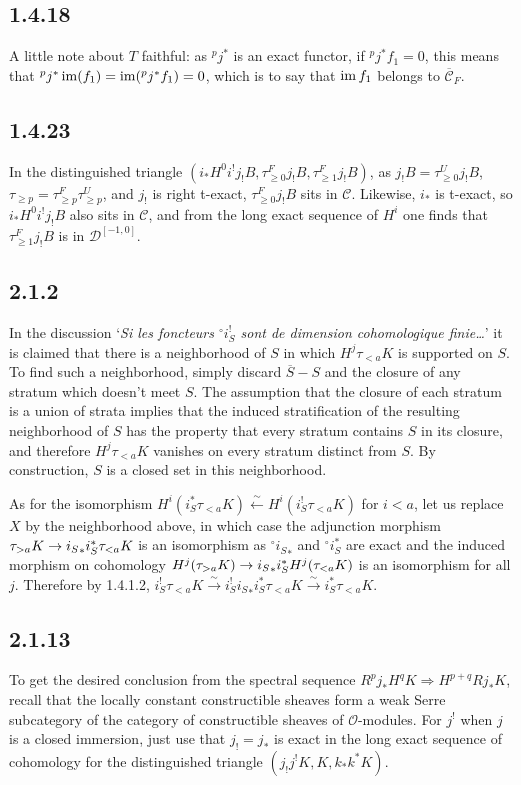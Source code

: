 \documentclass[deligne.tex]{subfiles}
\begin{document}
	\subsection*{1.4.18} A little note about $T$ faithful: as $^pj^*$ is an exact
	functor, if $^pj^*f_1=0$, this means that 
	${}^pj^*\operatorname{im}(f_1)=\operatorname{im}(^pj^*f_1)=0$, which is to say that $\operatorname{im} f_1$
	belongs to $\overline{\mathcal C}_F$.
		
	\subsection*{1.4.23} In the distinguished triangle
	$(i_*H^0i^!j_!B,\tau_{\geq0}^Fj_!B,\tau_{\geq1}^Fj_!B)$,
	as $j_!B=\tau_{\geq0}^Uj_!B$,
	$\tau_{\geq p}=\tau_{\geq p}^F\tau_{\geq p}^U$,
	and $j_!$ is right t-exact, $\tau_{\geq0}^Fj_!B$ sits in $\mathcal C$.
	Likewise, $i_*$ is t-exact, so $i_*H^0i^!j_!B$ also sits in
	$\mathcal C$, and from the long exact sequence of $H^i$ one finds
	that $\tau_{\geq1}^Fj_!B$ is in $\mathcal D^{[-1,0]}$.
	
	\subsection*{2.1.2} In the discussion `\emph{Si les foncteurs $^\circ i^!_S$
	sont de dimension cohomologique finie…}' it is claimed that there is a
	neighborhood of $S$ in which $H^j\tau_{<a}K$ is supported on $S$.
	To find such a neighborhood, simply discard $\overline S-S$ and the
	closure of any stratum which doesn't meet $S$. The assumption that the
	closure of each stratum is a union of strata implies that the induced
	stratification of the resulting neighborhood of $S$ has the property
	that every stratum contains $S$ in its closure, and therefore
	$H^j\tau_{<a}K$ vanishes on every stratum distinct from $S$.
	By construction, $S$ is a closed set in this neighborhood.
	
	As for the isomorphism
	$H^i(i_S^*\tau_{<a}K)\xleftarrow{\sim}H^i(i_S^!\tau_{<a}K)$ for $i<a$,
	let us replace $X$ by the neighborhood above, in which case
	the adjunction morphism $\tau_{>a}K\rightarrow{i_S}_*i_S^*\tau_{<a}K$ is an
	isomorphism as $^\circ{i_S}_*$ and $^\circ i_S^*$ are exact and the 
	induced morphism on cohomology
	$H^j(\tau_{>a}K)\rightarrow{i_S}_*i_S^*H^j(\tau_{<a}K)$ is an
	isomorphism for all $j$. Therefore by 1.4.1.2,
	$i^!_S\tau_{<a}K\xrightarrow{\sim}i_S^!{i_S}_*i_S^*\tau_{<a}K\xrightarrow{\sim}i_S^*\tau_{<a}K$.
	
	\subsection*{2.1.13} To get the desired conclusion from the spectral sequence
	$R^pj_*H^qK\Rightarrow H^{p+q}Rj_*K$, recall that the locally constant
	constructible sheaves form a weak Serre subcategory of the category of 
	constructible sheaves of $\mathcal O$-modules. For $j^!$ when $j$ is a
	closed immersion, just use that $j_!=j_*$ is exact in the long exact
	sequence of cohomology for the distinguished triangle
	$(j_!j^!K,K,k_*k^*K)$.
	
\end{document}
